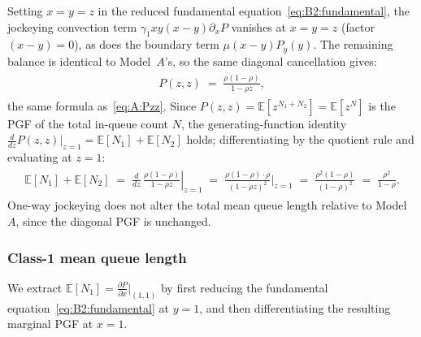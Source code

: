 Setting $x=y=z$ in the reduced fundamental equation~\eqref{eq:B2:fundamental}, the
jockeying convection term $\gamma_1 xy(x-y)\partial_xP$ vanishes at $x=y=z$
(factor $(x-y)=0$), as does the boundary term $\mu(x-y)P_y(y)$.  The remaining
balance is identical to Model~$A$'s, so the same diagonal cancellation gives:
\begin{align}
    \begin{split}
        P(z,z) \;=\; \frac{\rho(1-\rho)}{1-\rho z},
    \end{split}
    \label{eq:B2:Pzz}
\end{align}
the same formula as~\eqref{eq:A:Pzz}.  Since $P(z,z)=\mathbb{E}[z^{N_1+N_2}]=\mathbb{E}[z^{N}]$
is the PGF of the total in-queue count $N$, the generating-function identity
$\tfrac{d}{dz}P(z,z)\big|_{z=1}=\mathbb{E}[N_1]+\mathbb{E}[N_2]$ holds;
differentiating by the quotient rule and evaluating at $z=1$:
\begin{align}
    \begin{split}
        \mathbb{E}[N_1]+\mathbb{E}[N_2]
        \;=\; \left.\frac{d}{dz}\,\frac{\rho(1-\rho)}{1-\rho z}\right|_{z=1}
        \;=\; \frac{\rho(1-\rho)\cdot\rho}{(1-\rho z)^2}\bigg|_{z=1}
        \;=\; \frac{\rho^2(1-\rho)}{(1-\rho)^2}
        \;=\; \frac{\rho^2}{1-\rho}.
    \end{split}
    \label{eq:B2:EN}
\end{align}
One-way jockeying does not alter the total mean queue length relative to
Model~$A$, since the diagonal PGF is unchanged.

\subsubsection*{Class-1 mean queue length}

We extract $\mathbb{E}[N_1]=\tfrac{\partial P}{\partial x}\big|_{(1,1)}$ by first
reducing the fundamental equation~\eqref{eq:B2:fundamental} at $y=1$, and then
differentiating the resulting marginal PGF at $x=1$.

